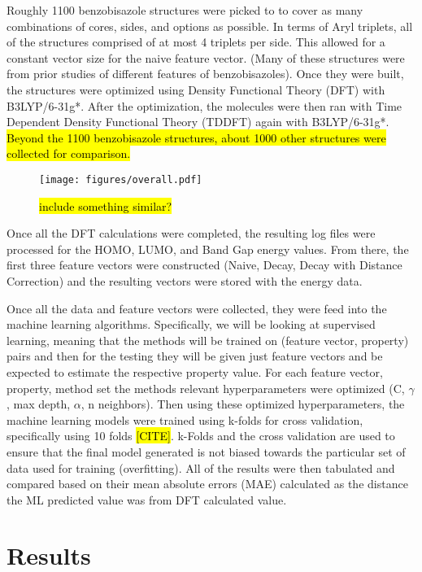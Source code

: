 \documentclass[10pt]{article}
\begin{document}
Roughly 1100 benzobisazole structures were picked to to cover as many combinations of cores, sides, and options as possible. In terms of Aryl triplets, all of the structures comprised of at most 4 triplets per side. This allowed for a constant vector size for the naive feature vector. (Many of these structures were from prior studies of different features of benzobisazoles). Once they were built, the structures were optimized using Density Functional Theory (DFT) with B3LYP/6-31g*. After the optimization, the molecules were then ran with Time Dependent Density Functional Theory (TDDFT) again with B3LYP/6-31g*. \hl{Beyond the 1100 benzobisazole structures, about 1000 other structures were collected for comparison.}

 \begin{figure}[H]
   \begin{center}
     \texttt{[image: figures/overall.pdf]}
   \end{center}
   \caption{\hl{include something similar?}}
   \label{fig:scan}
 \end{figure}


Once all the DFT calculations were completed, the resulting log files were processed for the HOMO, LUMO, and Band Gap energy values. From there, the first three feature vectors were constructed (Naive, Decay, Decay with Distance Correction) and the resulting vectors were stored with the energy data.

Once all the data and feature vectors were collected, they were feed into the machine learning algorithms. Specifically, we will be looking at supervised learning, meaning that the methods will be trained on (feature vector, property) pairs and then for the testing they will be given just feature vectors and be expected to estimate the respective property value. For each feature vector, property, method set the methods relevant hyperparameters were optimized (C, $\gamma$, max depth, $\alpha$, n neighbors). Then using these optimized hyperparameters, the machine learning models were trained using k-folds for cross validation, specifically using 10 folds \hl{[CITE]}. k-Folds and the cross validation are used to ensure that the final model generated is not biased towards the particular set of data used for training (overfitting). All of the results were then tabulated and compared based on their mean absolute errors (MAE) calculated as the distance the ML predicted value was from DFT calculated value.


\section{Results}
\end{document}
